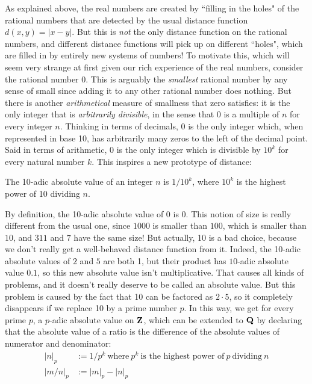 \documentclass[11pt,oneside]{amsart}
\begin{document}
As explained above, the real numbers are created by ``filling in the holes" of the rational numbers that are detected by the
usual distance function $d(x,y)=|x-y|$.  
But this is {\em not} the only distance function on the rational numbers, and
different distance functions will pick up on different ``holes", which are filled in by entirely new systems of numbers!
To motivate this, which will seem very strange at first given our rich experience of the real numbers, consider the rational
number 0.  This is arguably the {\em smallest} rational number by any sense of small since adding it to any other rational number
does nothing.  But there is another {\em arithmetical} measure of smallness that zero satisfies: it is the only integer
that is {\em arbitrarily divisible}, in the sense that $0$ is a multiple of $n$ for every integer $n$.  Thinking in terms of 
decimals, $0$ is the only integer which, when represented in base 10, has arbitrarily many zeros to the left of the decimal point.
Said in terms of arithmetic, 0 is the only integer which is divisible by $10^k$ for every natural number $k$.
This inspires a new prototype of distance:

\begin{definition}
	The 10-adic absolute value of an integer $n$ is $1/10^k$, where $10^k$ is the highest power of
	10 dividing $n$.
\end{definition}  

By definition, the 10-adic absolute value of $0$ is 0.  This notion of size 
is really different from the usual one, since $1000$ is smaller than $100$, which is smaller than $10$,
and $311$ and $7$ have the same size!  But actually, 10 is a bad choice, because we don't really get a well-behaved
distance function from it.  Indeed, the 10-adic absolute values of $2$ and $5$ are both 1, but their product has 
$10$-adic absolute value $0.1$, so this new absolute value isn't multiplicative.  That causes all kinds of problems,
and it doesn't really deserve to be called an absolute value.  But this problem is caused by the fact that 10 can be factored as $2\cdot 5$,
so it completely disappears if we replace 10 by a prime number $p$.  In this way, we get for every prime $p$,
a $p$-adic absolute value on $\mathbf{Z}$, which can be extended to $\mathbf{Q}$ by declaring that the absolute value of
a ratio is the difference of the absolute values of numerator and denominator:
\begin{align*}
	|n|_p &:= 1/p^k\ \text{where}\ p^k\ \text{is the highest power of}\ p\ \text{dividing}\ n \\
	|m/n|_p &:= |m|_p - |n|_p
\end{align*}
\end{document}
